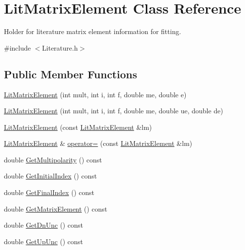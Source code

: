 \hypertarget{classLitMatrixElement}{\section{Lit\-Matrix\-Element Class Reference}
\label{classLitMatrixElement}
}


Holder for literature matrix element information for fitting.  




{\ttfamily \#include $<$Literature.\-h$>$}

\subsection*{Public Member Functions}
\begin{DoxyCompactItemize}
\item 
\hyperlink{classLitMatrixElement_a4e7e58478592e997126bbce544d0f60e}{Lit\-Matrix\-Element} (int mult, int i, int f, double me, double e)
\item 
\hyperlink{classLitMatrixElement_adcce2a88c148edc9282cbb904a481e7b}{Lit\-Matrix\-Element} (int mult, int i, int f, double me, double ue, double de)
\item 
\hyperlink{classLitMatrixElement_a557a7030501da531631de4538c568a2a}{Lit\-Matrix\-Element} (const \hyperlink{classLitMatrixElement}{Lit\-Matrix\-Element} \&lm)
\item 
\hyperlink{classLitMatrixElement}{Lit\-Matrix\-Element} \& \hyperlink{classLitMatrixElement_a07e75cb4e608186b8359fb9b0111d9f6}{operator=} (const \hyperlink{classLitMatrixElement}{Lit\-Matrix\-Element} \&lm)
\item 
double \hyperlink{classLitMatrixElement_af528ba9511d16f12e8574e73a0492df5}{Get\-Multipolarity} () const 
\item 
double \hyperlink{classLitMatrixElement_af8e215126b3c4c6373b78ffd2c0f61bd}{Get\-Initial\-Index} () const 
\item 
double \hyperlink{classLitMatrixElement_a6c4afde8ca56112da851f0127ebf7167}{Get\-Final\-Index} () const 
\item 
double \hyperlink{classLitMatrixElement_a116167b1cae1c4e34eeb79c9fdd6de74}{Get\-Matrix\-Element} () const 
\item 
double \hyperlink{classLitMatrixElement_aaf8fb29e4540e135a8a47251d0de4afd}{Get\-Dn\-Unc} () const 
\item 
double \hyperlink{classLitMatrixElement_a7727b59fc5afbf41f9826c01aa56dfeb}{Get\-Up\-Unc} () const 
\end{DoxyCompactItemize}


